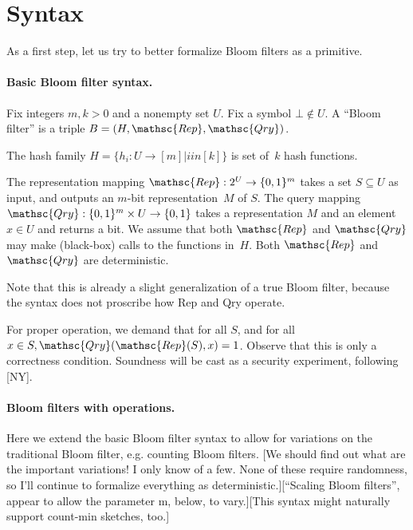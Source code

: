 \section{Syntax}
As a first step, let us try to better formalize Bloom filters as a primitive.

\paragraph{Basic Bloom filter syntax.}
Fix integers $m,k > 0$ and a nonempty set $U$.  Fix a symbol $\bot \not\in U$.  A “Bloom filter” is a triple  $B=(H,\mathsc{Rep},\mathsc{Qry})$.  

The hash family $H = \{h_i : U \rightarrow [m]  | i in [k]\}$ is  set of~$k$ hash functions.  

The representation mapping $\mathsc{Rep}: 2^U \rightarrow \bits^m$ takes a set $S \subseteq U$ as input, and outputs an $m$-bit representation~$M$ of $S$.  The query mapping $\mathsc{Qry}: \bits^m \times U \rightarrow \bits$ takes a representation $M$ and an element $x \in U$ and returns a bit.  We assume that both $\mathsc{Rep}$ and $\mathsc{Qry}$ may make (black-box) calls to the functions in~$H$.  Both $\mathsc{Rep}$ and $\mathsc{Qry}$ are deterministic.

Note that this is already a slight generalization of a true Bloom filter, because the syntax does not proscribe how Rep and Qry operate.


For proper operation, we demand that for all $S$, and for all $x \in S, \mathsc{Qry}(\mathsc{Rep}(S),x)=1$.  Observe that this is only a correctness condition.  Soundness will be cast as a security experiment, following [NY].


\paragraph{Bloom filters with operations. }
Here we extend the basic Bloom filter syntax to allow for variations on the traditional Bloom filter, e.g. counting Bloom filters.  [We should find out what are the important variations! I only know of a few.  None of these require randomness, so I'll continue to formalize everything as deterministic.][“Scaling Bloom filters”, appear to allow the parameter m, below, to vary.][This syntax might naturally support count-min sketches, too.]

